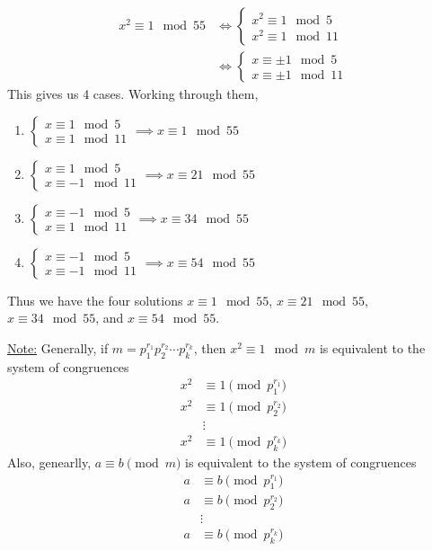 \documentclass{article}
\begin{document}
\begin{align*}
    x^2\equiv 1\mod 55&\iff \begin{cases}
    x^2\equiv 1\mod 5\\
    x^2\equiv 1\mod 11
    \end{cases}\\
    &\iff \begin{cases}
        x\equiv \pm 1\mod 5\\
        x\equiv \pm 1\mod 11
    \end{cases}
\end{align*}This gives us 4 cases. Working through them, \begin{enumerate}
    \item $\begin{cases}
        x\equiv 1\mod 5\\
        x\equiv 1\mod 11
    \end{cases}\implies x\equiv 1\mod 55$
    \item $\begin{cases}
        x\equiv 1\mod 5\\
        x\equiv -1\mod 11
    \end{cases}\implies x\equiv 21\mod 55$
    \item $\begin{cases}
        x\equiv -1\mod 5\\
        x\equiv 1\mod 11
    \end{cases}\implies x\equiv 34\mod 55$
    \item $\begin{cases}
        x\equiv -1\mod 5\\
        x\equiv -1\mod 11
    \end{cases}\implies x\equiv 54\mod 55$
\end{enumerate}
Thus we have the four solutions $x\equiv 1\mod 55$, $x\equiv 21\mod 55$, $x\equiv 34\mod 55$, and $x\equiv 54\mod 55$.

\underline{Note:} Generally, if $m=p_1^{r_1}p_2^{r_2}\cdots p_k^{r_k}$, then $x^2\equiv 1\mod m$ is equivalent to the system of congruences \begin{align*}
    x^2&\equiv 1\pmod{p_1^{r_1}}\\
    x^2&\equiv 1\pmod{p_2^{r_2}}\\
    &\vdots\\
    x^2&\equiv 1\pmod{p_k^{r_k}}
\end{align*}Also, genearlly, $a\equiv b\pmod m$ is equivalent to the system of congruences \begin{align*}
    a&\equiv b\pmod{p_1^{r_1}}\\
    a&\equiv b\pmod{p_2^{r_2}}\\
    &\vdots\\
    a&\equiv b\pmod{p_k^{r_k}}
\end{align*}
\end{document}
